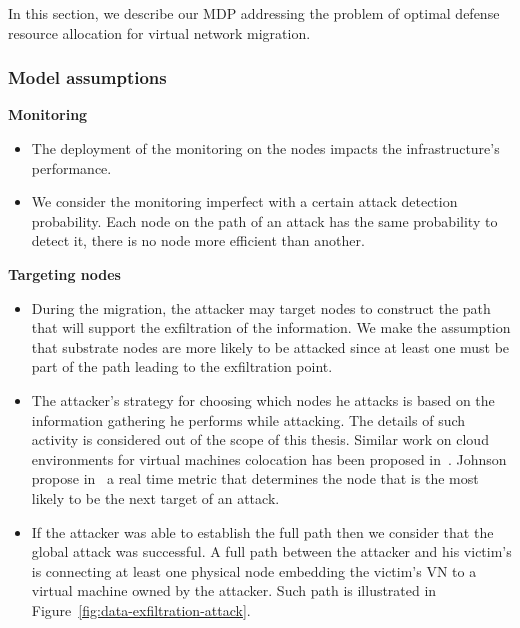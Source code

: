 \label{sec:mdp-model}
In this section, we describe our MDP addressing the problem of optimal defense resource allocation for virtual network migration.

\subsubsection{Model assumptions}
\label{sec:mdp-model-assumption}

\textbf{Monitoring}
\begin{itemize}
    \item The deployment of the monitoring on the nodes impacts the infrastructure's performance. 
    
    \item We consider the monitoring imperfect with a certain attack detection probability.
    Each node on the path of an attack has the same probability to detect it, \ie there is no node more efficient than another. 
\end{itemize}


\textbf{Targeting nodes}
\begin{itemize}
    \item During the migration, the attacker may target nodes to construct the path that will support the exfiltration of the information.
    We make the assumption that substrate nodes are more likely to be attacked since at least one must be part of the path leading to the exfiltration point.
    
    \item The attacker's strategy for choosing which nodes he attacks is based on the information gathering he performs while attacking. The details of such activity is considered out of the scope of this thesis.
    Similar work on cloud environments for virtual machines colocation has been proposed in~\cite{getoffmucloud-Ristenpart2009, incentivemtd-Zhang2012}.
    Johnson \etal propose in~\cite{mitigateAPT-johnson2013} a real time metric that determines the node that is the most likely to be the next target of an attack.
    
    \item
    If the attacker was able to establish the full path then we consider that the global attack was successful.
    A full path between the attacker and his victim's is connecting at least one physical node embedding the victim's VN to a virtual machine owned by the attacker. Such path is illustrated in Figure~\ref{fig:data-exfiltration-attack}.
\end{itemize}



